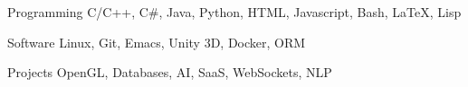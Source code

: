 

\begin{cvskills}

  \cvskill
    {Programming} %
    {C/C++, C\#, Java, Python, HTML, Javascript, Bash, LaTeX, Lisp}

  \cvskill
    {Software} %
    {Linux, Git, Emacs, Unity 3D, Docker, ORM} %

  \cvskill
    {Projects} %
    {OpenGL, Databases, AI, SaaS, WebSockets, NLP} %


\end{cvskills}
